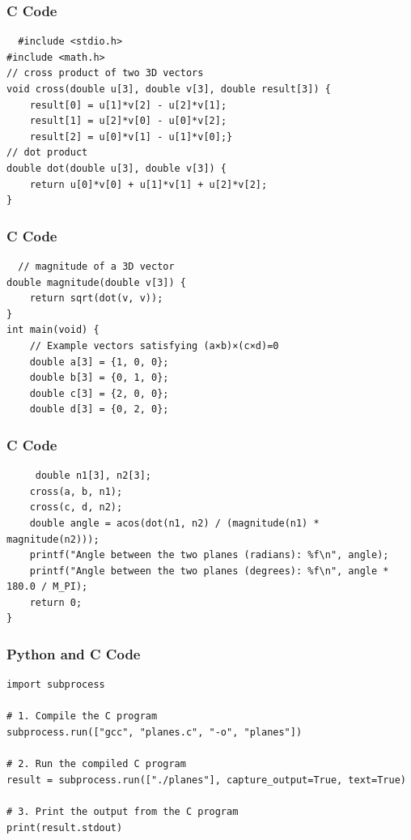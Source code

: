\documentclass{beamer}
\begin{document}
\begin{frame}[fragile]
\frametitle{C Code}
\begin{lstlisting}
  #include <stdio.h>
#include <math.h>
// cross product of two 3D vectors
void cross(double u[3], double v[3], double result[3]) {
    result[0] = u[1]*v[2] - u[2]*v[1];
    result[1] = u[2]*v[0] - u[0]*v[2];
    result[2] = u[0]*v[1] - u[1]*v[0];}
// dot product
double dot(double u[3], double v[3]) {
    return u[0]*v[0] + u[1]*v[1] + u[2]*v[2];
}
\end{lstlisting}
\end{frame}

\begin{frame}[fragile]
\frametitle{C Code}
\begin{lstlisting}
  // magnitude of a 3D vector
double magnitude(double v[3]) {
    return sqrt(dot(v, v));
}
int main(void) {
    // Example vectors satisfying (a×b)×(c×d)=0
    double a[3] = {1, 0, 0};
    double b[3] = {0, 1, 0};
    double c[3] = {2, 0, 0};
    double d[3] = {0, 2, 0};
\end{lstlisting}

\end{frame}

\begin{frame}[fragile]
\frametitle{C Code}
\begin{lstlisting}
     double n1[3], n2[3];
    cross(a, b, n1);
    cross(c, d, n2);
    double angle = acos(dot(n1, n2) / (magnitude(n1) * magnitude(n2)));
    printf("Angle between the two planes (radians): %f\n", angle);
    printf("Angle between the two planes (degrees): %f\n", angle * 180.0 / M_PI);
    return 0;
}
\end{lstlisting}

\end{frame}

\begin{frame}[fragile]
\frametitle{Python and C Code}

\begin{lstlisting}
import subprocess

# 1. Compile the C program
subprocess.run(["gcc", "planes.c", "-o", "planes"])

# 2. Run the compiled C program
result = subprocess.run(["./planes"], capture_output=True, text=True)

# 3. Print the output from the C program
print(result.stdout)
\end{lstlisting}

\end{frame}
\end{document}
